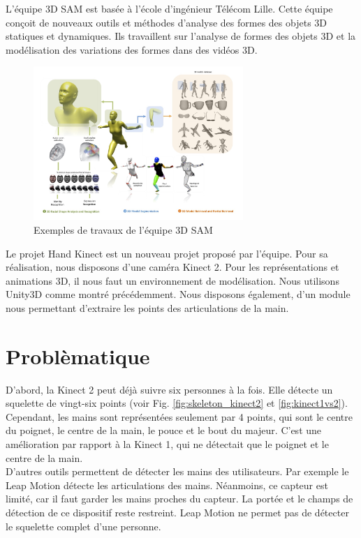 L'équipe 3D SAM est basée à l'école d'ingénieur Télécom Lille. 
Cette équipe conçoit de nouveaux outils et méthodes d'analyse des 
formes des objets 3D statiques et dynamiques. Ils travaillent sur 
l'analyse de formes des objets 3D et la modélisation des variations 
des formes dans des vidéos 3D.

\begin{figure}[H]
  \begin{center}
    \includegraphics[width=300px]{images/accueil-illus.jpg}
    \caption{Exemples de travaux de l'équipe 3D SAM}
  \end{center}
\end{figure}

Le projet \og Hand Kinect \fg est un nouveau projet proposé par 
l'équipe.
Pour sa réalisation, nous disposons d'une caméra Kinect 2. 
Pour les représentations et animations 3D, il nous faut un environnement 
de modélisation. Nous utilisons Unity3D comme montré précédemment. 
Nous disposons également, d'un module nous permettant d'extraire les 
points des articulations de la main.

\section{Problèmatique}
D'abord, la Kinect 2 peut déjà suivre six personnes à la fois. Elle 
détecte un squelette de vingt-six points (voir Fig. 
\ref{fig:skeleton_kinect2} et \ref{fig:kinect1vs2}). Cependant, les 
mains sont représentées seulement par 4 points, qui sont le centre du
poignet, le centre de la main, le pouce et le bout du majeur. C'est une 
amélioration par rapport à la Kinect 1, qui ne détectait que le poignet 
et le centre de la main.\\

D'autres outils permettent de détecter les mains des utilisateurs. Par 
exemple le Leap Motion détecte les articulations des mains. Néanmoins,
ce capteur est limité, car il faut garder les mains proches du capteur.
La portée et le champs de détection de ce dispositif reste restreint. 
Leap Motion ne permet pas de détecter le squelette complet d'une personne.\\

